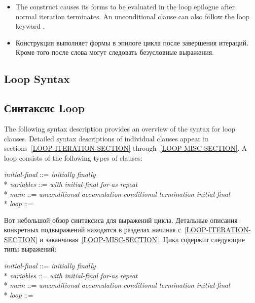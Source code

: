 \begin{itemize}
\begin{itemize}
  \item The  construct causes its forms to be evaluated
    in the loop epilogue after normal iteration terminates.  An
    unconditional clause can also follow the loop keyword
    .

  \item Конструкция  выполняет формы в эпилоге цикла
    после завершения итераций. Кроме того после слова 
    могут следовать безусловные выражения.
  \end{itemize}
  \end{itemize}


  \subsection{Loop Syntax}

  \subsection{Синтаксис Loop}

  The following syntax description provides an overview of the syntax
for loop clauses.  Detailed syntax descriptions of individual clauses
appear in sections~\ref{LOOP-ITERATION-SECTION}
through~\ref{LOOP-MISC-SECTION}.  A loop consists of the following
types of clauses:

\begin{tabbing} \emph{initial-final\/} ::= \emph{initially\/} {\Mor}
\emph{finally\/} \\* \emph{variables\/} ::= \emph{with\/} {\Mor}
\emph{initial-final\/} {\Mor} \emph{for-as\/} {\Mor} \emph{repeat} \\*
\emph{main\/} ::= \emph{unconditional\/} {\Mor} \emph{accumulation\/}
{\Mor} \emph{conditional\/} {\Mor} \emph{termination\/} {\Mor}
\emph{initial-final\/} \\* \emph{loop\/} ::= 
\end{tabbing}

Вот небольшой обзор синтаксиса для выражений цикла. Детальные описания
конкретных подвыражений находятся в разделах начиная
с~\ref{LOOP-ITERATION-SECTION} и
заканчивая~\ref{LOOP-MISC-SECTION}. Цикл содержит следующие типы
выражений:
\begin{tabbing} \emph{initial-final\/} ::= \emph{initially\/} {\Mor}
\emph{finally\/} \\* \emph{variables\/} ::= \emph{with\/} {\Mor}
\emph{initial-final\/} {\Mor} \emph{for-as\/} {\Mor} \emph{repeat} \\*
\emph{main\/} ::= \emph{unconditional\/} {\Mor} \emph{accumulation\/}
{\Mor} \emph{conditional\/} {\Mor} \emph{termination\/} {\Mor}
\emph{initial-final\/} \\* \emph{loop\/} ::= 
\end{tabbing}

